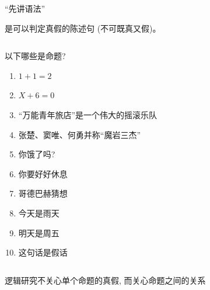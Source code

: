 
\begin{frame}{}
  \begin{center}
    {\Large ``先讲语法''}

    \vspace{0.30cm}
  \end{center}
\end{frame}

\begin{frame}{}
  \begin{definition}[命题 (Proposition)]
    是可以判定真假的陈述句 (不可既真又假)。
  \end{definition}

  \pause
  \begin{columns}
      \begin{exampleblock}{以下哪些是命题?}
        \begin{enumerate}
          \item $1 + 1 = 2$
          \item $X + 6 = 0$
          \pause
          \item ``万能青年旅店''是一个伟大的摇滚乐队
          \item 张楚、窦唯、何勇并称``魔岩三杰''
          \item 你饿了吗?
          \item 你要好好休息
          \pause
          \item 哥德巴赫猜想
          \pause
          \item 今天是雨天
          \item 明天是周五
          \pause
          \item 这句话是假话
        \end{enumerate}
      \end{exampleblock}
      \pause
  \end{columns}
\end{frame}

\begin{frame}{}
  \begin{center}

    \vspace{1.00cm}
    逻辑研究不关心单个命题的真假, 而关心命题之间的关系
  \end{center}
\end{frame}

